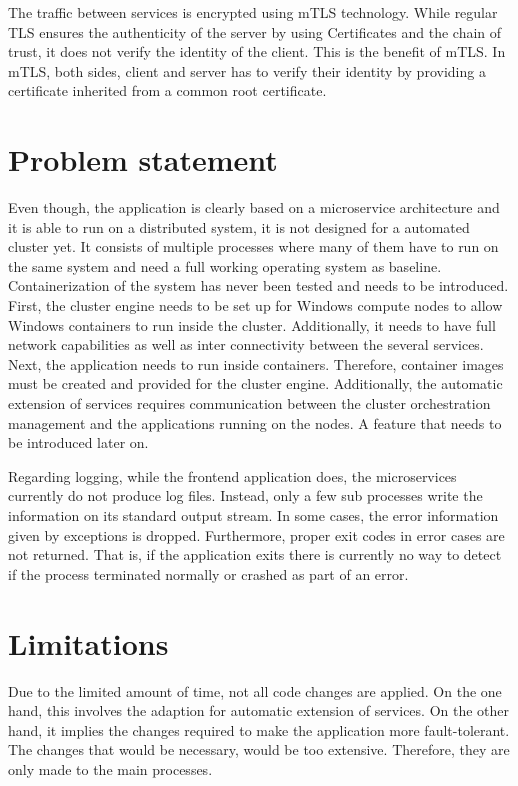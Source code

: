 The traffic between services is encrypted using \ac{mTLS} technology. While regular \ac{TLS} ensures the authenticity of the server by using Certificates and the chain of trust, it does not verify the identity of the client. This is the benefit of \ac{mTLS}. In \ac{mTLS}, both sides, client and server has to verify their identity by providing a certificate inherited from a common root certificate.

\section{Problem statement}
Even though, the application is clearly based on a microservice architecture and it is able to run on a distributed system, it is not designed for a automated cluster yet. It consists of multiple processes where many of them have to run on the same system and need a full working operating system as baseline. Containerization of the system has never been tested and needs to be introduced. 
First, the cluster engine needs to be set up for \ac{Windows} compute nodes to allow \ac{Windows} containers to run inside the cluster. Additionally, it needs to have full network capabilities as well as inter connectivity between the several services.
Next, the application needs to run inside containers. Therefore, container images must be created and provided for the cluster engine. 
Additionally, the automatic extension of services requires communication between the cluster orchestration management and the applications running on the nodes. A feature that needs to be introduced later on.

Regarding logging, while the frontend application does, the microservices currently do not produce log files. Instead, only a few sub processes write the information on its standard output stream. In some cases, the error information given by exceptions is dropped.
Furthermore, proper exit codes in error cases are not returned. That is, if the application exits there is currently no way to detect if the process terminated normally or crashed as part of an error.

\section{Limitations}
Due to the limited amount of time, not all code changes are applied. On the one hand, this involves the adaption for automatic extension of services. On the other hand, it implies the changes required to make the application more fault-tolerant. The changes that would be necessary, would be too extensive. Therefore, they are only made to the main processes.

